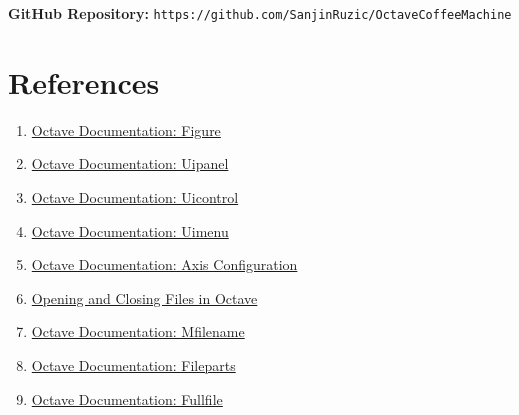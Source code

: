 \documentclass[a4paper, 11pt]{article}
\begin{document}
\noindent \textbf{GitHub Repository:} \texttt{https://github.com/SanjinRuzic/OctaveCoffeeMachine}

\newpage
\section{References}
\begin{enumerate}
\item \href{https://octave.sourceforge.io/octave/function/figure.html}{Octave Documentation: Figure}
\item \href{https://octave.sourceforge.io/octave/function/uipanel.html}{Octave Documentation: Uipanel}
\item \href{https://octave.sourceforge.io/octave/function/uicontrol.html}{Octave Documentation: Uicontrol}
\item \href{https://octave.sourceforge.io/octave/function/uimenu.html}{Octave Documentation: Uimenu}
\item \href{https://docs.octave.org/v4.2.1/Axis-Configuration.html}{Octave Documentation: Axis Configuration}
\item \href{https://bioweb.pasteur.fr/docs/modules/octave/3.8.2/octave/Opening-and-Closing-Files.html}{Opening and Closing Files in Octave}
\item \href{https://octave.sourceforge.io/octave/function/mfilename.html}{Octave Documentation: Mfilename}
\item \href{https://octave.sourceforge.io/octave/function/fileparts.html}{Octave Documentation: Fileparts}
\item \href{https://octave.sourceforge.io/octave/function/fullfile.html}{Octave Documentation: Fullfile}
\end{enumerate}
\end{document}
